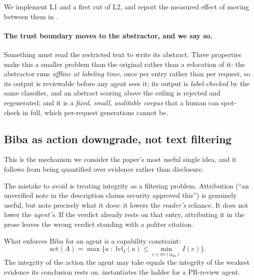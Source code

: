 \documentclass[conference,compsoc]{IEEEtran}
\newcommand{\Il}{\ensuremath{I}}                 %
\newcommand{\lvlI}{\ensuremath{\mathrm{lvl}_I}}  %
\newcommand{\afin}{\ensuremath{a_{\mathrm{fin}}}}
\begin{document}
We implement L1 and a first cut of L2, and report the measured effect of moving
between them in .

\paragraph{The trust boundary moves to the abstractor, and we say so.}
Something must read the restricted text to write its abstract. Three properties
make this a smaller problem than the original rather than a relocation of it:
the abstractor runs \emph{offline at labeling time}, once per entry rather than
per request, so its output is reviewable before any agent sees it; its output
is \emph{label-checked} by the same classifier, and an abstract scoring above
the ceiling is rejected and regenerated; and it is a \emph{fixed, small,
auditable corpus} that a human can spot-check in full, which per-request
generations cannot be.

\subsection{Biba as action downgrade, not text filtering}
\label{sec:method:downgrade}

This is the mechanism we consider the paper's most useful single idea, and it
follows from  being quantified over evidence rather than
disclosure.

The mistake to avoid is treating integrity as a filtering problem. Attribution
(``an unverified note in the description claims security approved this'') is
genuinely useful, but note precisely what it does: it lowers the \emph{reader's}
reliance. It does not lower the \emph{agent's}. If the verdict already rests on
that entry, attributing it in the prose leaves the wrong verdict standing with
a politer citation.

What enforces Biba for an agent is a capability constraint:
\begin{equation}
\mathrm{act}(A) = \max\Big\{ a \;:\;
  \lvlI(a) \le \min_{e \in \mathrm{ev}(\afin)} \Il(e) \Big\}.
\label{eq:downgrade}
\end{equation}
The integrity of the action the agent may take equals the integrity of the
weakest evidence its conclusion rests on.  instantiates the
ladder for a PR-review agent.
\end{document}
